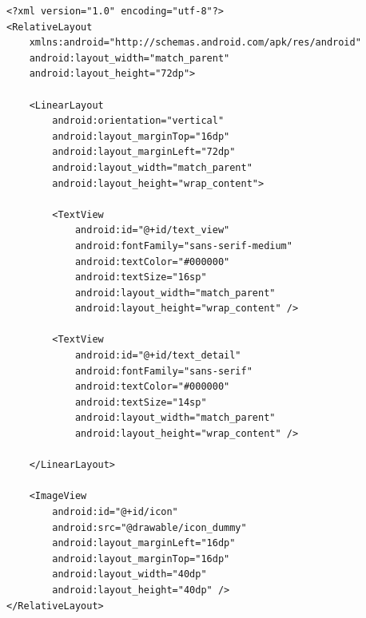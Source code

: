 \begin{lstlisting}[style=csharp, label=lst:widgetLayoutSample, caption={Layout mit Icon, Text und Detailtext}]
<?xml version="1.0" encoding="utf-8"?>
<RelativeLayout
	xmlns:android="http://schemas.android.com/apk/res/android"
	android:layout_width="match_parent"
	android:layout_height="72dp">

	<LinearLayout
		android:orientation="vertical"
		android:layout_marginTop="16dp"
		android:layout_marginLeft="72dp"
		android:layout_width="match_parent"
		android:layout_height="wrap_content">

		<TextView
			android:id="@+id/text_view"
			android:fontFamily="sans-serif-medium"
			android:textColor="#000000"
			android:textSize="16sp"
			android:layout_width="match_parent"
			android:layout_height="wrap_content" />

		<TextView
			android:id="@+id/text_detail"
			android:fontFamily="sans-serif"
			android:textColor="#000000"
			android:textSize="14sp"
			android:layout_width="match_parent"
			android:layout_height="wrap_content" />

	</LinearLayout>

	<ImageView
		android:id="@+id/icon"
		android:src="@drawable/icon_dummy"
		android:layout_marginLeft="16dp"
		android:layout_marginTop="16dp"
		android:layout_width="40dp"
		android:layout_height="40dp" />
</RelativeLayout>
\end{lstlisting}

